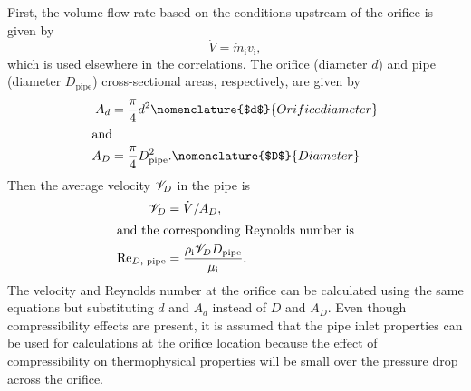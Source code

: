 First, the volume flow rate based on the conditions 
upstream of the orifice is given by
\begin{equation}
  \dot{V} = \dot{m}_{\text{i}}v_{\text{i}},
\end{equation}
which is used elsewhere in the correlations.
The orifice (diameter $d$) and 
pipe (diameter $D_{\text{pipe}}$) cross-sectional areas, 
respectively, are given by
\begin{align}
  A_d &= \frac{\pi}{4} d^2 
  \nomenclature{$d$}{Orifice diameter\nomunit{\inch}} \\
  \shortintertext{and}
  A_D &= \frac{\pi}{4} D_{\text{pipe}}^2.
  \nomenclature{$D$}{Diameter\nomunit{\foot,\,\inch}}
\end{align}
Then  the average velocity $\mathscr{V}_D$ in the pipe is
\begin{align}
  \mathscr{V}_D &= \dot{V}/A_D, \\
  \intertext{and the corresponding Reynolds number is}
  \mathrm{Re}_{D,\text{ pipe}} &= \frac{\rho_{\text{i}} \mathscr{V}_D D_{\text{pipe}}}{\mu_{\text{i}}}.
\end{align}
The velocity and Reynolds number at the orifice can be calculated using 
the same equations but substituting $d$ and $A_d$ instead of $D$ and $A_D$.
Even though compressibility effects are present, it is assumed that the pipe inlet properties
can be used for calculations at the orifice location because the effect of compressibility
on thermophysical properties will be small over the pressure drop across the orifice.

